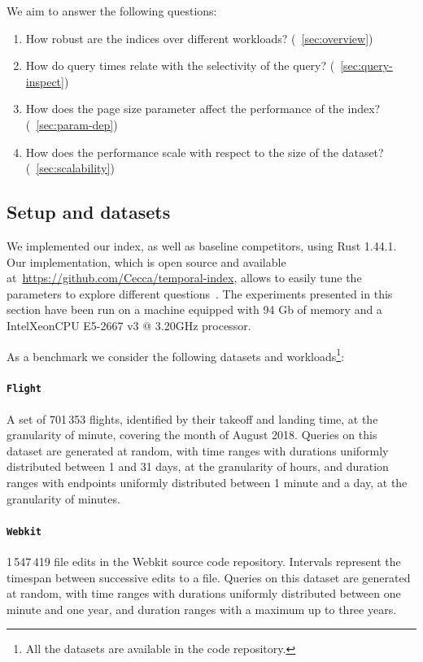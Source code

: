 \documentclass[sigconf,nonacm,anonymous]{acmart}
\theoremstyle{definition}
\newcommand{\dataset}[1]{\texttt{#1}}
\begin{document}
We aim to answer the following questions:
\begin{enumerate}
	\item How robust are the indices over different workloads? (\textsection~\ref{sec:overview})
	\item How do query times relate with the selectivity of the query? (\textsection~\ref{sec:query-inspect})
	\item How does the page size parameter affect the performance of the index? (\textsection~\ref{sec:param-dep})
	\item How does the performance scale with respect to the size of the dataset? (\textsection~\ref{sec:scalability})
\end{enumerate}

\subsection{Setup and datasets}

We implemented our index, as well as baseline competitors,
using Rust 1.44.1. Our implementation, which is open source and available
at~\url{https://github.com/Cecca/temporal-index}, allows to easily tune the parameters to explore
different questions~\cite{DBLP:conf/sisap/AumullerC20}.
The experiments presented in this section have been run on a machine
equipped with 94 Gb of memory and a Intel\textregistered Xeon\textregistered CPU E5-2667 v3 @ 3.20GHz processor.

As a benchmark we consider the following datasets and workloads\footnote{
	All the datasets are available in the code repository.}:
%
\paragraph{\dataset{Flight}} A set of 701\,353 flights, identified by their
takeoff and landing time, at the granularity of minute, covering the month
of August 2018.
Queries on this dataset are generated at random, with time ranges with durations
uniformly distributed between 1 and 31 days, at the granularity of hours,
and duration ranges with endpoints uniformly distributed between 1 minute and
a day, at the granularity of minutes.
%
\paragraph{\dataset{Webkit}} 1\,547\,419 file edits in the Webkit source code repository.
Intervals represent the timespan between successive edits to a file.
Queries on this dataset are generated at random, with time ranges with durations uniformly distributed between
one minute and one year,
and duration ranges with a maximum up to three years.
%
\end{document}
